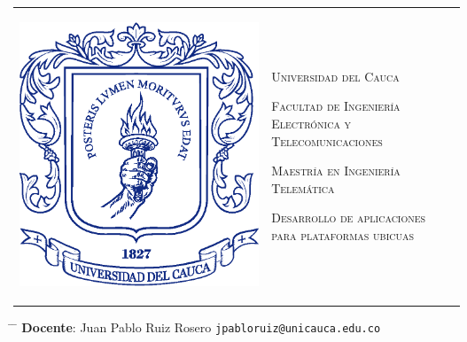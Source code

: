 \documentclass[10pt,letterpaper]{article}
\begin{document}
\newcommand\upquote[1]{\textquotesingle#1\textquotesingle}



\begin{tabular}{p{1.3in}p{6in}}
\begin{flushleft}
\noindent \includegraphics[bb = 2.5cm 0cm 10.29cm 9.78cm,scale=0.2]{escudoUnicacuaSolo.eps}
\end{flushleft} &
\normalsize \vspace{0.6cm}
\textsc{Universidad del Cauca}

\textsc{Facultad de Ingeniería Electrónica y Telecomunicaciones}

\textsc{Maestría en Ingeniería Telemática}

\textsc{Desarrollo de aplicaciones para plataformas ubicuas}

\end{tabular}
\begin{tabbing}
\hspace{3cm} \= \hspace{5.3cm} \= \hspace{6cm} \kill
\textbf{Docente}: \> Juan Pablo Ruiz Rosero			\> \texttt{jpabloruiz@unicauca.edu.co} \\
\end{tabbing}
\end{document}
